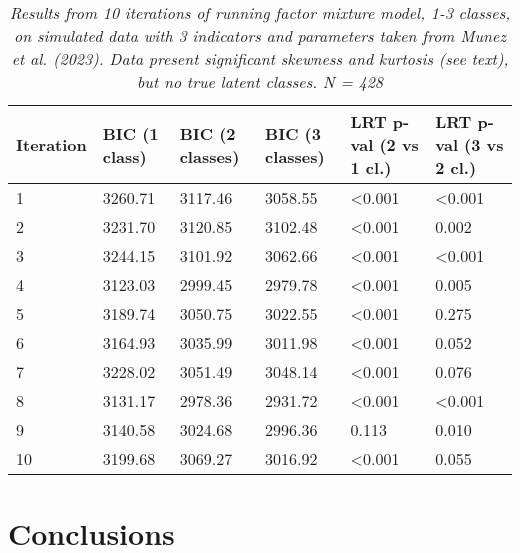 \documentclass[letterpaper,11pt]{article}
\begin{document}
\begin{table}[htbp]
    \centering
    \label{tab:iterationResults}
    \caption{\newline \textit{Results from 10 iterations of running factor mixture model, 1-3 classes, on simulated data with 3 indicators and parameters taken from Munez et al. (2023). Data present significant skewness and kurtosis (see text), but no true latent classes. N = 428}}
    \begin{tabularx}{\textwidth}{XXXXXX}
       \toprule
        \textbf{Iteration} & \textbf{BIC \newline(1 class)} & \textbf{BIC \newline(2 classes)} & \textbf{BIC \newline(3 classes)} & \textbf{LRT p-val \newline(2 vs 1 cl.)} & \textbf{LRT p-val \newline(3 vs 2 cl.)}  \\
        \midrule
        1 & 3260.71 & 3117.46 & 3058.55 & \textless 0.001 & \textless 0.001 \\
        2 & 3231.70 & 3120.85 & 3102.48 & \textless 0.001 & 0.002 \\
        3 & 3244.15 & 3101.92 & 3062.66 & \textless 0.001 & \textless 0.001 \\
        4 & 3123.03 & 2999.45 & 2979.78 & \textless 0.001 & 0.005 \\
        5 & 3189.74 & 3050.75 & 3022.55 & \textless 0.001 & 0.275 \\
        6 & 3164.93 & 3035.99 & 3011.98 & \textless 0.001 & 0.052 \\
        7 & 3228.02 & 3051.49 & 3048.14 & \textless 0.001 & 0.076 \\
        8 & 3131.17 & 2978.36 & 2931.72 & \textless 0.001 & \textless 0.001 \\
        9 & 3140.58 & 3024.68 & 2996.36 & 0.113 & 0.010 \\
       10 & 3199.68 & 3069.27 & 3016.92 & \textless 0.001 & 0.055 \\
        \bottomrule
    \end{tabularx}
\end{table}

\section*{Conclusions}
\end{document}

